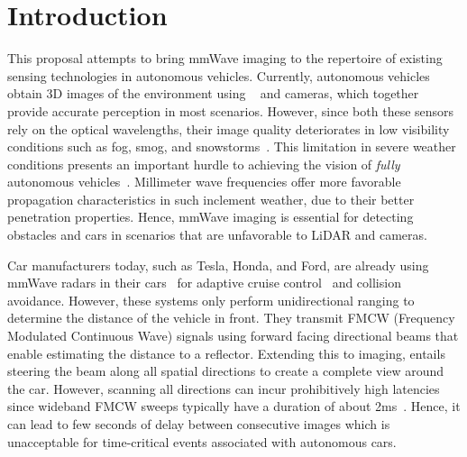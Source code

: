 \section{Introduction}
\vspace{-0.2in}
This proposal attempts to bring mmWave imaging to the repertoire of existing
sensing technologies in autonomous vehicles. Currently, autonomous vehicles
obtain %
3D images of the environment using
\lidar~\cite{wiki:Lidar} and cameras, which together
provide accurate perception in most scenarios.  However, since both these
sensors rely on the optical wavelengths, their image quality deteriorates in
low visibility conditions such as fog, smog, and
snowstorms~\cite{kohanbash_2016,yamauchi2010fusing,barnard_2016}.  This
limitation in severe weather conditions presents an important hurdle to
achieving the vision of \textit{fully} autonomous vehicles~\cite{marshall_2017,
boudette_2016}. Millimeter wave frequencies offer more favorable
propagation characteristics in such inclement weather, due to their better
penetration properties. Hence, mmWave imaging is essential for detecting
obstacles and cars in scenarios that are unfavorable to LiDAR and cameras. 



Car manufacturers today, such as Tesla, Honda, and Ford, are already using
mmWave radars in their cars~\cite{tesla,ford_acc,honda_sensing,bmw} for
adaptive cruise control~\cite{wiki_acc} and collision avoidance. However, these
systems only perform unidirectional ranging to determine the distance of the
vehicle in front. They transmit FMCW (Frequency Modulated Continuous Wave) 
signals using forward facing directional beams that enable estimating the 
distance to a reflector. Extending this to imaging, entails steering the
beam along all spatial directions to create a complete view around the car.
However, scanning all directions can incur prohibitively high latencies since 
wideband FMCW sweeps typically have a duration of about 2ms~\cite{sweep_2ms_1, sweep_2ms_2}.
Hence, it can lead to few seconds of delay between consecutive images which is unacceptable for 
time-critical events associated with autonomous cars. 


\iffalse
\begin{figure}
	\centering
	\texttt{[image: ../Photos/hardware\_setups]}
	\caption{\footnotesize{Current platform, circuit and setup}}
	\label{fig:circuit_setup}
\end{figure}
\fi

